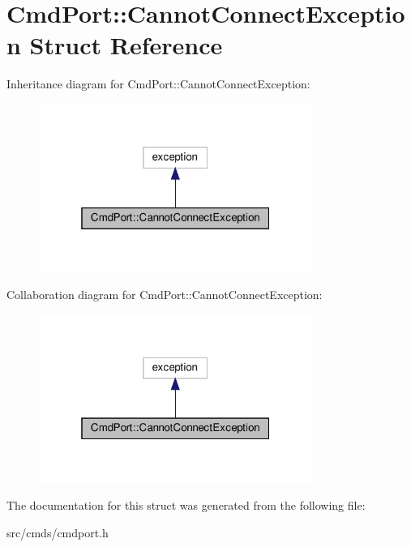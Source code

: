 \hypertarget{structCmdPort_1_1CannotConnectException}{}\section{Cmd\+Port\+:\+:Cannot\+Connect\+Exception Struct Reference}
\label{structCmdPort_1_1CannotConnectException}


Inheritance diagram for Cmd\+Port\+:\+:Cannot\+Connect\+Exception\+:
\nopagebreak
\begin{figure}[H]
\begin{center}
\leavevmode
\includegraphics[width=253pt]{structCmdPort_1_1CannotConnectException__inherit__graph}
\end{center}
\end{figure}


Collaboration diagram for Cmd\+Port\+:\+:Cannot\+Connect\+Exception\+:
\nopagebreak
\begin{figure}[H]
\begin{center}
\leavevmode
\includegraphics[width=253pt]{structCmdPort_1_1CannotConnectException__coll__graph}
\end{center}
\end{figure}


The documentation for this struct was generated from the following file\+:\begin{DoxyCompactItemize}
\item 
src/cmds/cmdport.\+h\end{DoxyCompactItemize}
